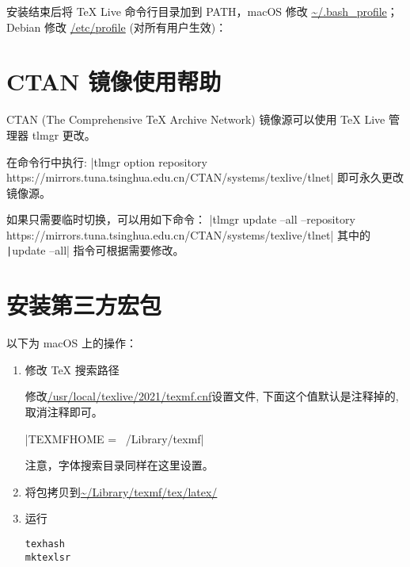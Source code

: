 安装结束后将 {\TeX}  Live 命令行目录加到 PATH，macOS 修改 \url{~/.bash_profile}；
Debian 修改 \url{/etc/profile} (对所有用户生效)：


\section{CTAN 镜像使用帮助}

CTAN (The Comprehensive TeX Archive Network) 镜像源可以使用 {\TeX} Live 管理器 tlmgr 更改。

在命令行中执行:
|tlmgr option repository https://mirrors.tuna.tsinghua.edu.cn/CTAN/systems/texlive/tlnet|
即可永久更改镜像源。

如果只需要临时切换，可以用如下命令：
|tlmgr update --all --repository https://mirrors.tuna.tsinghua.edu.cn/CTAN/systems/texlive/tlnet|
其中的 \texttt|update --all| 指令可根据需要修改。

\section{安装第三方宏包}

以下为 macOS 上的操作：

\begin{enumerate}
\item 修改 TeX 搜索路径 

修改\url{/usr/local/texlive/2021/texmf.cnf}设置文件, 下面这个值默认是注释掉的, 取消注释即可。

|TEXMFHOME = ~/Library/texmf|

注意，字体搜索目录同样在这里设置。

\item 将包拷贝到\url{~/Library/texmf/tex/latex/}

\item 运行

\begin{verbatim}
texhash
mktexlsr
\end{verbatim}
\end{enumerate}
